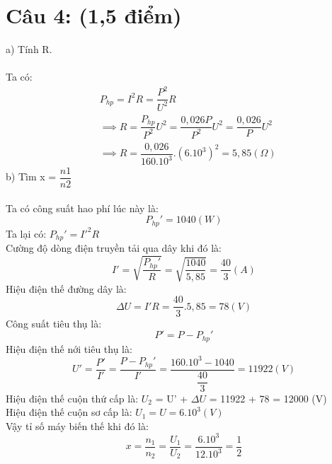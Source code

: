 \documentclass[50pt]{article}
\begin{document}
\section*{Câu 4: (1,5 điểm)}
a) Tính R.\\
\\
Ta có:
\begin{equation*}
    \begin{aligned}
        & P_{hp} = I^2R = \dfrac{P^2}{U^2}R \\
        & \implies R = \dfrac{P_{hp}}{P^2}U^2 = \dfrac{0,026P}{P^2}U^2 = \dfrac{0,026}{P}U^2 \\
        & \implies R = \dfrac{0,026}{160.10^3}.(6.10^3)^2 = 5,85 (\Omega)
    \end{aligned}
\end{equation*}
b) Tìm x = $\dfrac{n1}{n2}$\\
\\
Ta có công suất hao phí lúc này là:
\begin{equation*}
    P_{hp}' = 1040 (W)
\end{equation*}
Ta lại có: $P_{hp}' = I'^2R$\\
Cường độ dòng điện truyền tải qua dây khi đó là:
\begin{equation*}
    I' = \sqrt{\dfrac{P_{hp}'}{R}} = \sqrt{\dfrac{1040}{5,85}} = \dfrac{40}{3} (A)
\end{equation*}
Hiệu điện thế đường dây là:
\begin{equation*}
    \Delta U = I'R = \dfrac{40}{3}.5,85 = 78 (V)
\end{equation*}
Công suất tiêu thụ là:
\begin{equation*}
    P' = P - P_{hp}'
\end{equation*}
Hiệu điện thế nới tiêu thụ là:
\begin{equation*}
    U' = \dfrac{P'}{I'} = \dfrac{P - P_{hp}'}{I'} = \dfrac{160.10^3 - 1040}{\dfrac{40}{3}} = 11922 (V)
\end{equation*}
Hiệu điện thế cuộn thứ cấp là: $U_{2}$ = U' + $\Delta U$ = 11922 + 78 = 12000 (V)\\
Hiệu điện thế cuộn sơ cấp là: $U_{1} = U = 6.10^3 (V)$\\
Vậy tỉ số máy biến thế khi đó là:
\begin{equation*}
    x = \dfrac{n_{1}}{n_{2}} = \dfrac{U_{1}}{U_{2}} = \dfrac{6.10^3}{12.10^3} = \dfrac{1}{2}
\end{equation*}
\end{document}
